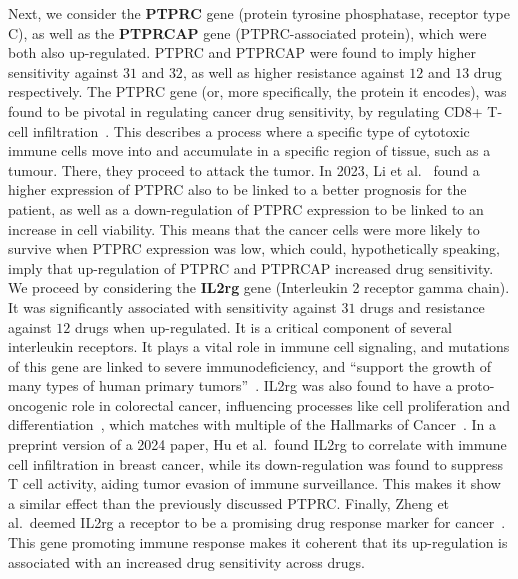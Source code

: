 Next, we consider the \textbf{PTPRC} gene (protein tyrosine phosphatase, receptor type C), as well as the \textbf{PTPRCAP} gene (PTPRC-associated protein), which were both also up-regulated. PTPRC and PTPRCAP were found to imply higher sensitivity against $31$ and $32$, as well as higher resistance against $12$ and $13$ drug respectively. The PTPRC gene (or, more specifically, the protein it encodes), was found to be pivotal in regulating cancer drug sensitivity, by regulating CD8+ T-cell infiltration~\cite{ptprc_cd8+}. This describes a process where a specific type of cytotoxic immune cells move into and accumulate in a specific region of tissue, such as a tumour. There, they proceed to attack the tumor. In 2023, Li et al.~\cite{ptprc_cd8+} found a higher expression of PTPRC also to be linked to a better prognosis for the patient, as well as a down-regulation of PTPRC expression to be linked to an increase in cell viability. This means that the cancer cells were more likely to survive when PTPRC expression was low, which could, hypothetically speaking, imply that up-regulation of PTPRC and PTPRCAP increased drug sensitivity.\\
We proceed by considering the \textbf{IL2rg} gene (Interleukin 2 receptor gamma chain). It was significantly associated with sensitivity against $31$ drugs and resistance against $12$ drugs when up-regulated. It is a critical component of several interleukin receptors. It plays a vital role in immune cell signaling, and mutations of this gene are linked to severe immunodeficiency, and ``support the growth of many types of human primary tumors''~\cite{il2rg}. IL2rg was also found to have a proto-oncogenic role in colorectal cancer, influencing processes like cell proliferation and differentiation~\cite{il2rg_differentiation}, which matches with multiple of the Hallmarks of Cancer~\cite{hallmarks-of-cancer}. In a preprint version of a 2024 paper, Hu et al.\ found IL2rg to correlate with immune cell infiltration in breast cancer, while its down-regulation was found to suppress T cell activity, aiding tumor evasion of immune surveillance. This makes it show a similar effect than the previously discussed PTPRC\@. Finally, Zheng et al.\ deemed IL2rg a receptor to be a promising drug response marker for cancer~\cite{il2rg_zheng}. This gene promoting immune response makes it coherent that its up-regulation is associated with an increased drug sensitivity across drugs.\\

